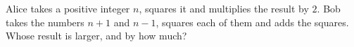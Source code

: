 Alice takes a positive integer $n$, squares it and multiplies the result by $2$. Bob takes the numbers $n+1$ and $n-1$, squares each of them and adds the squares. Whose result is larger, and by how much?
